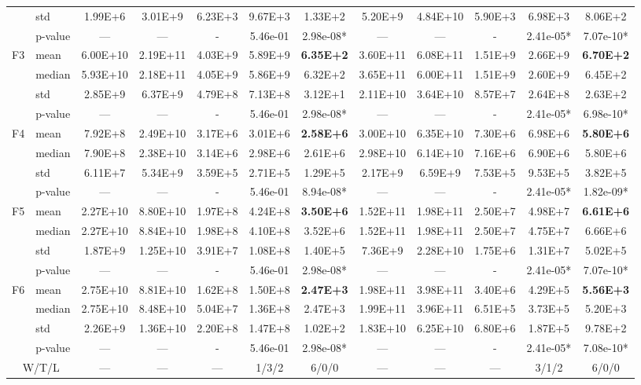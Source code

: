 \documentclass[conference]{IEEEtran}
\newcommand{\bestval}[1]{\cellcolor{bestcellbg}\bfseries #1}
\begin{document}
\begin{table}[!t]
{\begin{tabular}{llccccc|ccccc}
& std     & 1.99E+6 & 3.01E+9 & 6.23E+3 & 9.67E+3 & 1.33E+2 & 5.20E+9 & 4.84E+10 & 5.90E+3 & 6.98E+3 & 8.06E+2 \\
& p-value & --- & --- & - & 5.46e-01 & 2.98e-08* & --- & --- & - & 2.41e-05* & 7.07e-10* \\
\midrule
\multirow{4}{*}{F3}
& mean    & 6.00E+10 & 2.19E+11 & 4.03E+9 & 5.89E+9 & \bestval{6.35E+2} & 3.60E+11 & 6.08E+11 & 1.51E+9 & 2.66E+9 & \bestval{6.70E+2} \\
& median  & 5.93E+10 & 2.18E+11 & 4.05E+9 & 5.86E+9 & 6.32E+2 & 3.65E+11 & 6.00E+11 & 1.51E+9 & 2.60E+9 & 6.45E+2 \\
& std     & 2.85E+9 & 6.37E+9 & 4.79E+8 & 7.13E+8 & 3.12E+1 & 2.11E+10 & 3.64E+10 & 8.57E+7 & 2.64E+8 & 2.63E+2 \\
& p-value & --- & --- & - & 5.46e-01 & 2.98e-08* & --- & --- & - & 2.41e-05* & 6.98e-10* \\
\midrule
\multirow{4}{*}{F4}
& mean    & 7.92E+8 & 2.49E+10 & 3.17E+6 & 3.01E+6 & \bestval{2.58E+6} & 3.00E+10 & 6.35E+10 & 7.30E+6 & 6.98E+6 & \bestval{5.80E+6} \\
& median  & 7.90E+8 & 2.38E+10 & 3.14E+6 & 2.98E+6 & 2.61E+6 & 2.98E+10 & 6.14E+10 & 7.16E+6 & 6.90E+6 & 5.80E+6 \\
& std     & 6.11E+7 & 5.34E+9 & 3.59E+5 & 2.71E+5 & 1.29E+5 & 2.17E+9 & 6.59E+9 & 7.53E+5 & 9.53E+5 & 3.82E+5 \\
& p-value & --- & --- & - & 5.46e-01 & 8.94e-08* & --- & --- & - & 2.41e-05* & 1.82e-09* \\
\midrule
\multirow{4}{*}{F5}
& mean    & 2.27E+10 & 8.80E+10 & 1.97E+8 & 4.24E+8 & \bestval{3.50E+6} & 1.52E+11 & 1.98E+11 & 2.50E+7 & 4.98E+7 & \bestval{6.61E+6} \\
& median  & 2.27E+10 & 8.84E+10 & 1.98E+8 & 4.10E+8 & 3.52E+6 & 1.52E+11 & 1.98E+11 & 2.50E+7 & 4.75E+7 & 6.66E+6 \\
& std     & 1.87E+9 & 1.25E+10 & 3.91E+7 & 1.08E+8 & 1.40E+5 & 7.36E+9 & 2.28E+10 & 1.75E+6 & 1.31E+7 & 5.02E+5 \\
& p-value & --- & --- & - & 5.46e-01 & 2.98e-08* & --- & --- & - & 2.41e-05* & 7.07e-10* \\
\midrule
\multirow{4}{*}{F6}
& mean    & 2.75E+10 & 8.81E+10 & 1.62E+8 & 1.50E+8 & \bestval{2.47E+3} & 1.98E+11 & 3.98E+11 & 3.40E+6 & 4.29E+5 & \bestval{5.56E+3} \\
& median  & 2.75E+10 & 8.48E+10 & 5.04E+7 & 1.36E+8 & 2.47E+3 & 1.99E+11 & 3.96E+11 & 6.51E+5 & 3.73E+5 & 5.20E+3 \\
& std     & 2.26E+9 & 1.36E+10 & 2.20E+8 & 1.47E+8 & 1.02E+2 & 1.83E+10 & 6.25E+10 & 6.80E+6 & 1.87E+5 & 9.78E+2 \\
& p-value & --- & --- & - & 5.46e-01 & 2.98e-08* & --- & --- & - & 2.41e-05* & 7.08e-10* \\
\midrule
\multicolumn{2}{c}{W/T/L} & --- & --- & --- & 1/3/2 & 6/0/0 & --- & --- & --- & 3/1/2 & 6/0/0 \\
\bottomrule
\end{tabular}
}
\end{table}
\vspace{-0.3em}
\end{document}
